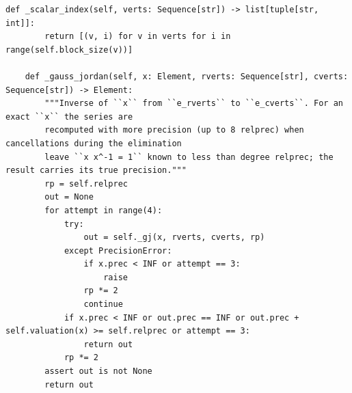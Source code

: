 \documentclass[12pt, a4paper]{report}
\theoremstyle{plain}
\theoremstyle{definition}
\theoremstyle{remark}
\theoremstyle{plain}
\begin{document}
\begin{lstlisting}[style=dsqcode]
    def _scalar_index(self, verts: Sequence[str]) -> list[tuple[str, int]]:
        return [(v, i) for v in verts for i in range(self.block_size(v))]

    def _gauss_jordan(self, x: Element, rverts: Sequence[str], cverts: Sequence[str]) -> Element:
        """Inverse of ``x`` from ``e_rverts`` to ``e_cverts``. For an exact ``x`` the series are
        recomputed with more precision (up to 8 relprec) when cancellations during the elimination
        leave ``x x^-1 = 1`` known to less than degree relprec; the result carries its true precision."""
        rp = self.relprec
        out = None
        for attempt in range(4):
            try:
                out = self._gj(x, rverts, cverts, rp)
            except PrecisionError:
                if x.prec < INF or attempt == 3:
                    raise
                rp *= 2
                continue
            if x.prec < INF or out.prec == INF or out.prec + self.valuation(x) >= self.relprec or attempt == 3:
                return out
            rp *= 2
        assert out is not None
        return out


\end{lstlisting}
\end{document}
